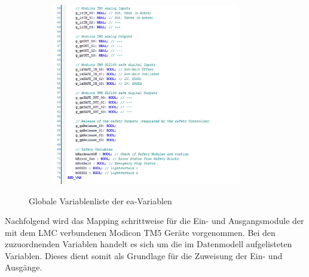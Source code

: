 \documentclass[../../../Bachelorarbeit.tex]{subfiles}
\begin{document}
\begin{figure}[H]
\begin{subfigure}[c]{0.42\textwidth}
        \includegraphics[width=0.9\textwidth]{Images/GVL2.png}
    \end{subfigure}
    \caption[Globale Variablenliste]{Globale Variablenliste der \acs{ea}-Variablen}
    \label{fig:my-img25}
\end{figure}

Nachfolgend wird das Mapping schrittweise für die Ein- und Ausgangsmodule der mit dem LMC verbundenen Modicon TM5 Geräte vorgenommen. Bei den zuzuordnenden Variablen handelt es sich um die im Datenmodell aufgelisteten Variablen. Dieses dient somit als Grundlage für die Zuweisung der Ein- und Ausgänge.
\end{document}
